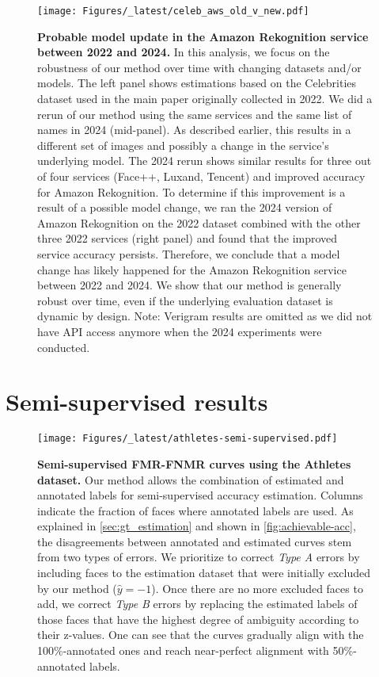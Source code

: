 \documentclass[10pt,twocolumn,letterpaper]{article}
\begin{document}
\begin{appendices}
\begin{figure}[ht!]
    \centering
    \texttt{[image: Figures/\_latest/celeb\_aws\_old\_v\_new.pdf]}
    \caption{{\bf Probable model update in the Amazon Rekognition service between 2022 and 2024.} In this analysis, we focus on the robustness of our method over time with changing datasets and/or models. The left panel shows estimations based on the Celebrities dataset used in the main paper originally collected in 2022. We did a rerun of our method using the same services and the same list of names in 2024 (mid-panel). As described earlier, this results in a different set of images and possibly a change in the service's underlying model.
    The 2024 rerun shows similar results for three out of four services (Face++, Luxand, Tencent) and improved accuracy for Amazon Rekognition.
    To determine if this improvement is a result of a possible model change, we ran the 2024 version of Amazon Rekognition on the 2022 dataset combined with the other three 2022 services (right panel) and found that the improved service accuracy persists. Therefore, we conclude that a model change has likely happened for the Amazon Rekognition service between 2022 and 2024.
    We show that our method is generally robust over time, even if the underlying evaluation dataset is dynamic by design. Note: Verigram results are omitted as we did not have API access anymore when the 2024 experiments were conducted.
    }
    \label{fig:celeb-aws-old-v-new}
\end{figure}

\newpage
\FloatBarrier
\section{Semi-supervised results}
\label{sec:semi-sup}

\begin{figure}[ht!]
    \centering
    \texttt{[image: Figures/\_latest/athletes-semi-supervised.pdf]}
    \caption{{\bf Semi-supervised FMR-FNMR curves using the Athletes dataset.} Our method allows the combination of estimated and annotated labels for semi-supervised accuracy estimation. Columns indicate the fraction of faces where annotated labels are used.
    As explained in \cref{sec:gt_estimation} and shown in \cref{fig:achievable-acc}, the disagreements between annotated and estimated curves stem from two types of errors. We prioritize to correct {\em Type A} errors by including faces to the estimation dataset that were initially excluded by our method ($\hat{y}=-1$). Once there are no more excluded faces to add, we correct {\em Type B} errors by replacing the estimated labels of those faces that have the highest degree of ambiguity according to their z-values.
    One can see that the curves gradually align with the 100\%-annotated ones and reach near-perfect alignment with 50\%-annotated labels.
    }
    \label{fig:semi-supervised}
\end{figure}

\end{appendices}
\end{document}
